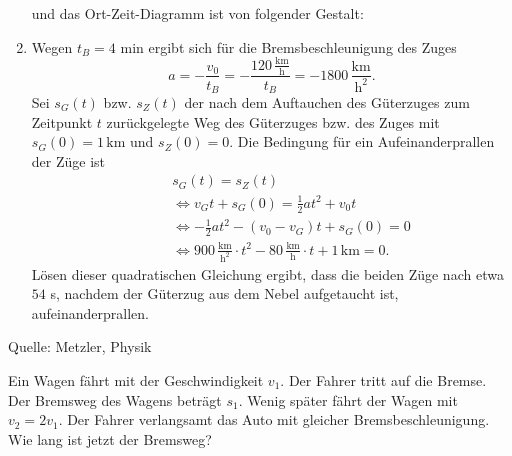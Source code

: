 \begin{MExercises}
\begin{MExercise}
\begin{MSolution}
\begin{enumerate}
      
      
      und das Ort-Zeit-Diagramm ist von folgender Gestalt:
      
      
      
      \item Wegen $t_B=4$ min ergibt sich f\"ur die Bremsbeschleunigung des Zuges 
      $$
      a=-\frac{v_0}{t_B}=-\frac{120 \,\frac{\text{km}}{\text{h}}}{t_B}=-1800\,\frac{\text{km}}{\text{h}^2}.
      $$ Sei $s_G(t)$ bzw. $s_Z(t)$ der nach dem Auftauchen des G\"uterzuges zum Zeitpunkt $t$ zur\"uckgelegte Weg des G\"uterzuges bzw. des Zuges mit $s_G(0)=1\,\text{km}$ und $s_Z(0)=0$. Die Bedingung f\"ur ein Aufeinanderprallen der Z\"uge ist
      \begin{eqnarray*}
      \qquad &s_G(t) =s_Z(t)\\
      &\Leftrightarrow v_G t + s_G(0) =\frac{1}{2} a t^2+v_0 t\\
      &\Leftrightarrow -\frac{1}{2} a t^2-(v_0-v_G)t+s_G(0)=0\\
      &\Leftrightarrow 900 \,\frac{\text{km}}{\text{h}^2}\cdot t^2 -80\,\frac{\text{km}}{\text{h}}\cdot t + 1\,\text{km} =0.
      \end{eqnarray*} L\"osen dieser quadratischen Gleichung ergibt, dass die beiden Z\"uge nach etwa $54$ s, nachdem der G\"uterzug aus dem Nebel aufgetaucht ist, aufeinanderprallen.
      
     \end{enumerate}
     \end{MSolution}
     
     Quelle: Metzler, Physik
     \end{MExercise}
     

    

     \begin{MExercise}
     Ein Wagen f\"ahrt mit der Geschwindigkeit $v_1$. Der Fahrer tritt auf die Bremse. Der Bremsweg des Wagens betr\"agt $s_1$. Wenig sp\"ater f\"ahrt der Wagen mit $v_2=2v_1$. Der Fahrer verlangsamt das Auto mit gleicher Bremsbeschleunigung. Wie lang ist jetzt der Bremsweg?
     

\end{MExercise}
\end{MExercises}
